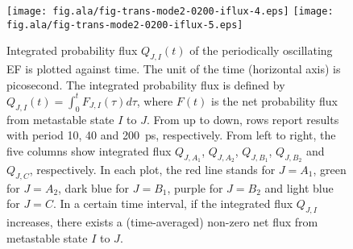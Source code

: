 \documentclass[a4paper,preprint,unsortedaddress,onecolumn]{revtex4-1}
\begin{document}
\begin{figure}
  \texttt{[image: fig.ala/fig-trans-mode2-0200-iflux-4.eps]}
  \texttt{[image: fig.ala/fig-trans-mode2-0200-iflux-5.eps]}\\
  \caption{
    Integrated probability flux $Q_{J,I}(t)$ of the periodically
    oscillating EF is plotted against time. The unit of the
    time (horizontal axis) is picosecond.
    The integrated
    probability flux is defined by $Q_{J,I}(t) = \int_0^t F_{J,I}(\tau) d\tau$, where
    $F(t)$ is the net probability flux from metastable state $I$ to $J$.
    From up to down, rows report results with  period 10, 40 and 200~ps, respectively.
    From left to right, the five
    columns show integrated flux $Q_{J,A_1}$, $Q_{J,A_2}$,
    $Q_{J,B_1}$, $Q_{J,B_2}$ and $Q_{J,C}$, respectively. In each plot,
    the red line stands for $J=A_1$, green for $J=A_2$, dark blue for $J=B_1$,
    purple for $J=B_2$ and light blue for $J=C$. In a certain time interval,
    if the integrated flux $Q_{J,I}$ increases, there exists a (time-averaged)
    non-zero net flux from metastable state $I$ to $J$.
  }
  \label{fig:tmp10}
\end{figure}
\end{document}
